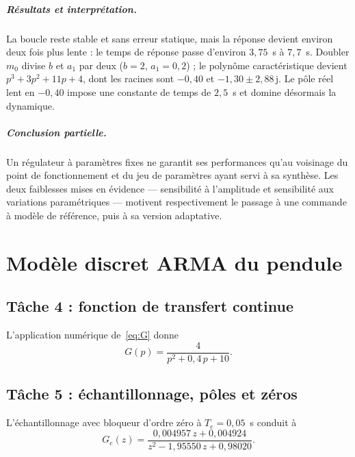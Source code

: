 \documentclass[11pt,a4paper]{report}
\begin{document}
\paragraph{Résultats et interprétation.} La boucle reste stable et sans erreur statique, mais la
réponse devient environ deux fois plus lente : le temps de réponse passe d'environ $3{,}75$~s à
$7{,}7$~s. Doubler $m_0$ divise $b$ et $a_1$ par deux ($b = 2$, $a_1 = 0{,}2$) ; le polynôme
caractéristique devient $p^3 + 3p^2 + 11p + 4$, dont les racines sont $-0{,}40$ et
$-1{,}30 \pm 2{,}88\,\mathrm{j}$. Le pôle réel lent en $-0{,}40$ impose une constante de temps
de $2{,}5$~s et domine désormais la dynamique.

\paragraph{Conclusion partielle.} Un régulateur à paramètres fixes ne garantit ses performances
qu'au voisinage du point de fonctionnement et du jeu de paramètres ayant servi à sa synthèse.
Les deux faiblesses mises en évidence --- sensibilité à l'amplitude et sensibilité aux
variations paramétriques --- motivent respectivement le passage à une commande à modèle de
référence, puis à sa version adaptative.

\chapter{Modèle discret ARMA du pendule}

\section{Tâche 4 : fonction de transfert continue}

L'application numérique de~\eqref{eq:G} donne
\begin{equation}
  G(p) = \frac{4}{p^2 + 0{,}4\,p + 10}.
\end{equation}

\section{Tâche 5 : échantillonnage, pôles et zéros}

L'échantillonnage avec bloqueur d'ordre zéro à $T_e = 0{,}05$~s conduit à
\begin{equation}
  G_e(z) = \frac{0{,}004957\,z + 0{,}004924}{z^2 - 1{,}95550\,z + 0{,}98020}.
\end{equation}
\end{document}
